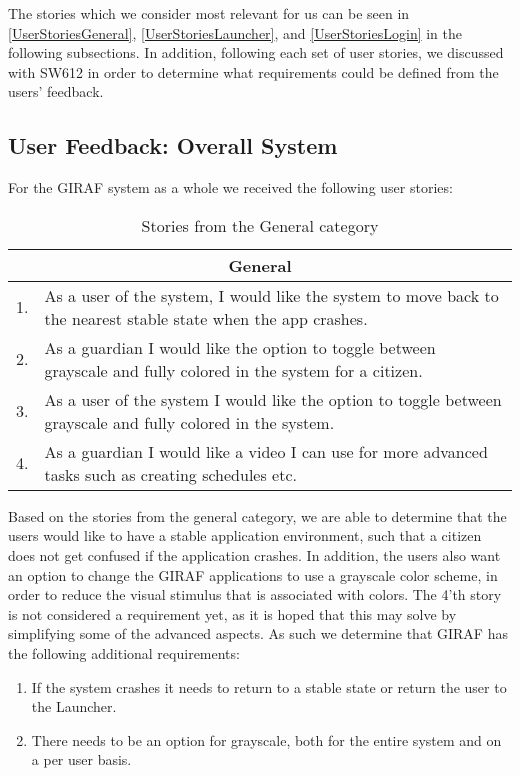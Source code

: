 The stories which we consider most relevant for us can be seen in
\autoref{UserStoriesGeneral}, \autoref{UserStoriesLauncher}, and
\autoref{UserStoriesLogin} in the following subsections. In addition, following
each set of user stories, we discussed with SW612 in order to determine what
requirements could be defined from the users' feedback.

\subsection{User Feedback: Overall System}
For the GIRAF system as a whole we received the following user stories:
\begin{table}[H]
\begin{tabular}{|c|p{12.5cm}|}
\hline 
\multicolumn{2}{|c|}{General}\\\hline
1. & As a user of the system, I would like the system to move back to the
nearest stable state when the app crashes.\\\hline
2. & As a guardian I would like the option to toggle between grayscale and fully
colored in the system for a citizen. \\ \hline
3. & As a user of the system I would like the option to toggle between grayscale
and fully colored in the system. \\\hline
4. & As a guardian I would like a video I can use for more advanced tasks such
as creating schedules etc.\\\hline
\end{tabular}
\caption{Stories from the General category}
\label{UserStoriesGeneral}
\end{table}

Based on the stories from the general category, we are able to determine that
the users would like to have a stable application environment, such that a
citizen does not get confused if the application crashes. In addition, the users
also want an option to change the GIRAF applications to use a grayscale color
scheme, in order to reduce the visual stimulus that is associated with colors.
The 4'th story is not considered a requirement yet, as it is hoped that this may
solve by simplifying some of the advanced aspects. As such we determine that
GIRAF has the following additional requirements:
\begin{enumerate}
  \item If the system crashes it needs to return to a stable state or return the
  user to the Launcher.
  \item There needs to be an option for grayscale, both for the entire system
  and on a per user basis.
\end{enumerate}

